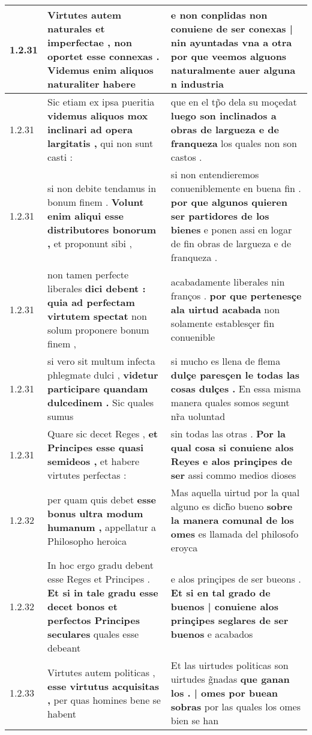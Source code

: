 \begin{tabular}{|p{1cm}|p{6.5cm}|p{6.5cm}|}
1.2.31 & Virtutes autem naturales et imperfectae , \textbf{ non oportet esse connexas . } Videmus enim aliquos naturaliter habere & e non conplidas \textbf{ non conuiene de ser conexas | nin ayuntadas vna a otra } por que veemos alguons naturalmente auer alguna n industria \\\hline
1.2.31 & Sic etiam ex ipsa pueritia \textbf{ videmus aliquos mox inclinari ad opera largitatis , } qui non sunt casti : & que en el tp̃o dela su moçedat \textbf{ luego son inclinados a obras de largueza e de franqueza } los quales non son castos . \\\hline
1.2.31 & si non debite tendamus in bonum finem . \textbf{ Volunt enim aliqui esse distributores bonorum , } et proponunt sibi , & si non entendieremos conueniblemente en buena fin . \textbf{ por que algunos quieren ser partidores de los bienes } e ponen assi en logar de fin obras de largueza e de franqueza . \\\hline
1.2.31 & non tamen perfecte liberales \textbf{ dici debent : quia ad perfectam virtutem spectat } non solum proponere bonum finem , & acabadamente liberales nin franços . \textbf{ por que pertenesçe ala uirtud acabada } non solamente establesçer fin conuenible \\\hline
1.2.31 & si vero sit multum infecta phlegmate dulci , \textbf{ videtur participare quandam dulcedinem . } Sic quales sumus & si mucho es llena de flema \textbf{ dulçe paresçen le todas las cosas dulçes . } En essa misma manera quales somos segunt nr̃a uoluntad \\\hline
1.2.31 & Quare sic decet Reges , \textbf{ et Principes esse quasi semideos , } et habere virtutes perfectas : & sin todas las otras . \textbf{ Por la qual cosa si conuiene alos Reyes e alos prinçipes de ser } assi commo medios dioses \\\hline
1.2.32 & per quam quis debet \textbf{ esse bonus ultra modum humanum , } appellatur a Philosopho heroica & Mas aquella uirtud por la qual alguno es dich̃o bueno \textbf{ sobre la manera comunal de los omes } es llamada del philosofo eroyca \\\hline
1.2.32 & In hoc ergo gradu debent esse Reges et Principes . \textbf{ Et si in tale gradu esse decet bonos et perfectos Principes seculares } quales esse debeant & e alos prinçipes de ser bueons . \textbf{ Et si en tal grado de buenos | conuiene alos prinçipes seglares de ser buenos } e acabados \\\hline
1.2.33 & Virtutes autem politicas , \textbf{ esse virtutus acquisitas , } per quas homines bene se habent & Et las uirtudes politicas son uirtudes g̃nadas \textbf{ que ganan los . | omes por buean sobras } por las quales los omes bien se han \\\hline

\end{tabular}
